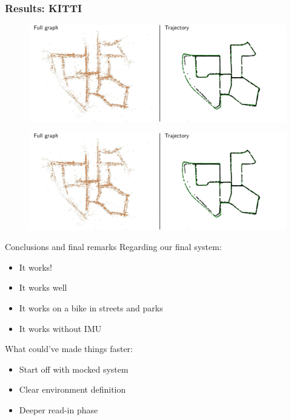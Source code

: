\documentclass[11pt]{beamer}
\begin{document}
\begin{frame}
\frametitle{Results: KITTI}
\begin{figure}[!htb]
\centering
\includegraphics[width=\textwidth]{figures/results/kitti_00.pdf}
\end{figure}
\begin{figure}[!htb]
\centering
\includegraphics[width=\textwidth]{figures/results/kitti_00.pdf}
\end{figure}
\end{frame}

\begin{frame}{Conclusions and final remarks}
Regarding our final system:
\begin{itemize}
\item It works!
\item It works well
\item It works on a bike in streets and parks
\item It works without IMU
\end{itemize}
\vspace{20pt}
What could've made things faster:
\begin{itemize}
\item Start off with mocked system
\item Clear environment definition
\item Deeper read-in phase
\end{itemize}
\end{frame}
\end{document}
